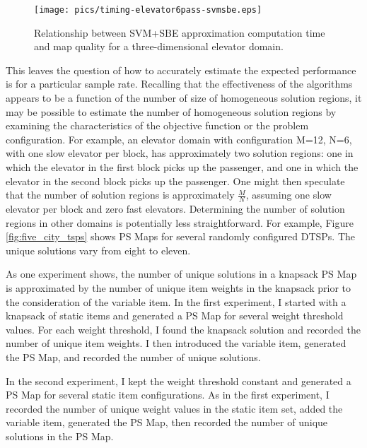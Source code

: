 \begin{figure}
\begin{center}
\texttt{[image: pics/timing-elevator6pass-svmsbe.eps]}
\caption{Relationship between SVM+SBE approximation computation time and map quality for a three-dimensional elevator domain.}
\label{fig:timing-elevator6pass-svmsbe}
\end{center}
\end{figure}


This leaves the question of how to accurately estimate the expected performance is for a particular sample rate. Recalling that the effectiveness of the algorithms appears to be a function of the number of size of homogeneous solution regions, it may be possible to estimate the number of homogeneous solution regions by examining the  characteristics of the objective function or the problem configuration.  For example, an elevator domain with configuration M=12, N=6, with one slow elevator per block, has approximately two solution regions:  one in which the elevator in the first block picks up the passenger, and one in which the elevator in the second block picks up the passenger.  One might then speculate that the  number of solution regions is approximately $\frac{M}{N}$, assuming one slow elevator per block and zero fast elevators.  Determining the number of solution regions in other domains is potentially less straightforward.  For example, Figure \ref{fig:five_city_tsps} shows PS Maps for several randomly configured DTSPs.  The unique solutions vary from eight to eleven.


As one experiment shows, the number of unique solutions in a knapsack PS Map is approximated by the number of unique item weights in the knapsack prior to the consideration of the variable item.  In the first experiment, I started with a knapsack of static items and generated a PS Map for several weight threshold values.  For each weight threshold, I found the knapsack solution and recorded the number of unique item weights.  I then introduced the variable item, generated the PS Map, and recorded the number of unique solutions.

In the second experiment, I kept the weight threshold constant and generated a PS Map for several static item  configurations.  As in the first experiment, I recorded the number of unique weight values in the static item set, added the variable item, generated the PS Map, then recorded the number of unique solutions in the PS Map.

